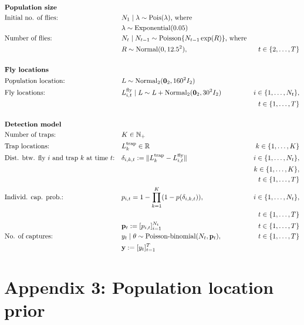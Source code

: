 \documentclass[
  oneside]{book}
\begin{document}
\[
\renewcommand{\baselinestretch}{1}\normalsize
\begin{aligned}
&\textbf{Population size} \\
&\text{Initial no. of flies:} && N_1 \mid \lambda \sim \mathrm{Pois}(\lambda) \text{, where} \\
&&& \lambda \sim \mathrm{Exponential}(0.05) \\
& \text{Number of flies:}~ && N_t \mid N_{t-1}  \sim \mathrm{Poisson}\{ N_{t-1} \exp(R) \} \text{, where} \\ & &&R \sim \mathrm{Normal}(0, 12.5^2), & t \in \{2, \ldots, T \} \\
\\
&\textbf{Fly locations} \\
& \text{Population location:} ~ && L \sim \mathrm{Normal_2}(\mathbf 0_2, 160^2 I_2) \\
& \text{Fly locations:}~ && L_{i,t}^\text{fly} \mid L \sim L + \mathrm{Normal}_2(\mathbf 0_2, 30^2 I_2) & i \in \{1, \ldots, N_t\}, \\
  &&&& t \in \{1, \ldots, T\}\\
\\
&\textbf{Detection model} \\
& \text{Number of traps:}~ && K \in \mathbb N_+ \\
& \text{Trap locations:}~ && L_k^\text{trap} \in \mathbb R & k \in \{1, \ldots, K\} \\
& \text{Dist. btw. fly } i \text{ and trap } k \text{ at time } t \text{:} && \delta_{i,k,t} := \lVert L_k^\text{trap} - L_{i,t}^\text{fly} \rVert & i \in \{1, \ldots, N_t\}, \\
  &&&& k \in \{1, \ldots, K\}, \\
  &&&& t \in \{1, \ldots, T\}\\
& \text{Individ. cap. prob.:} && p_{i, t} = 1 - \prod_{k=1}^K (1 - p(\delta_{i,k,t})), & i \in \{1, \ldots, N_t\}, \\
  &&&& t \in \{1, \ldots, T\}\\
&  && \mathbf p_t := [p_{i,t}]_{i=1}^{N_t}  & t \in \{1, \ldots, T\} \\
&\text{No. of captures:}~ && y_t \mid \theta \sim \text{Poisson-binomial}(N_t, \mathbf p_t), & t \in \{1, \ldots, T\} \\
  &&& \mathbf y := [y_t]_{t=1}^T
\end{aligned}
\renewcommand{\baselinestretch}{1}\normalsize
\]

\hypertarget{appendix-3-population-location-prior}{%
\section{Appendix 3: Population location prior}\label{appendix-3-population-location-prior}}
\end{document}
